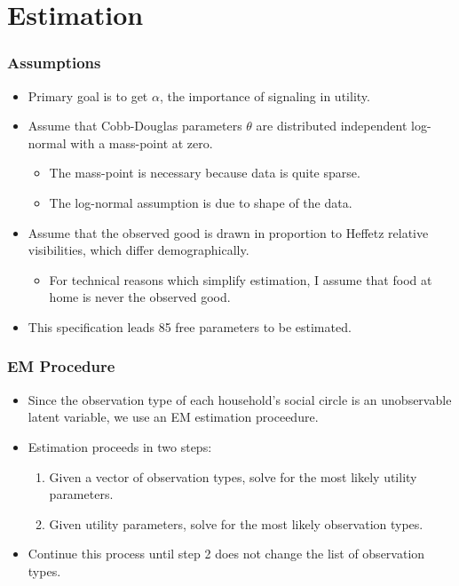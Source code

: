 \documentclass{beamer}
\begin{document}
 \section{Estimation}
 \begin{frame}[label=comeback]
  \frametitle{Assumptions}
  \begin{itemize}
    \item Primary goal is to get $\alpha$, the importance of signaling in utility.
    \item Assume that Cobb-Douglas parameters $\theta$ are distributed independent log-normal with a mass-point at zero.
      \begin{itemize}
	\item The mass-point is necessary because data is quite sparse.         
	\item The log-normal assumption is due to shape of the data. 
      \end{itemize}
\hyperlink{zeros}{} 
\hyperlink{logn}{}
    \item Assume that the observed good is drawn in proportion to Heffetz relative visibilities, which differ demographically.
      \begin{itemize}
	\item For technical reasons which simplify estimation, I assume that food at home is never the observed good.
      \end{itemize}
     \item This specification leads 85 free parameters to be estimated.
  \end{itemize}
 \end{frame}
%  
\begin{frame}
  \frametitle{EM Procedure}
  \begin{itemize}
    \item Since the observation type of each household's social circle is an unobservable latent variable, we use an EM estimation proceedure.
    \item Estimation proceeds in two steps:
      \begin{enumerate}
	\item Given a vector of observation types, solve for the most likely utility parameters.
	\item Given utility parameters, solve for the most likely observation types.
      \end{enumerate}
    \item Continue this process until step 2 does not change the list of observation types.
  \end{itemize}
\end{frame}
\end{document}
